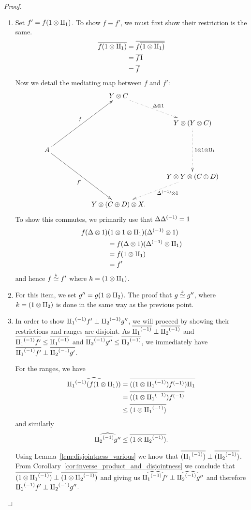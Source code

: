\begin{proof}
  \prepprooflist
  \begin{enumerate}[{(}i{)}]
  \item Set $f' = f(1\otimes\amalg_{1})$.
    To show $f\equiv f'$, we must first show their restriction is the same.
    \begin{align*}
      \overline{f(1\otimes\amalg_{1})} &= \overline{f\overline{(1\otimes\amalg_{1})}}\\
      & = \overline{f 1}\\
      &=  \overline{f}
    \end{align*}
    Now we detail the mediating map between $f$ and $f'$:
    \[
    \xymatrix @C=25pt @R=25pt{
      & & Y \* C \ar@{.>}[dr]^{\Delta\* 1}\\
      & & & Y \* (Y\* C) \ar@{.>}[dd]^{1\*1\*\cpa}\\
      A \ar[uurr]^f \ar[ddrr]_{f'} \\
      & & & Y \* Y\*(C\+ D) \ar@{.>}[dl]^(.4){\inv{\Delta}\* 1}\\
      && Y\*(C\+ D)\*X.
    }
    \]
  To show this commutes, we primarily use that $\Delta{\Delta}^{(-1)} = 1$
  \begin{align*}
    f(\Delta\otimes1)&(1\otimes1\otimes\amalg_{1})({\Delta}^{(-1)}\otimes1) \\
    &= f(\Delta\otimes1)({\Delta}^{(-1)} \otimes \amalg_{1})\\
    &= f(1 \otimes \amalg_{1})\\
    &= f'
  \end{align*}
  and hence $f\overset{\scriptscriptstyle h}{\simeq}f'$ where $h = (1\otimes\amalg_{1})$.
  \item For this item, we set $g'' = g(1\otimes\amalg_{2})$. The proof that $g\overset{\scriptscriptstyle k}{\simeq}g''$, where
    $k = (1\otimes\amalg_{2})$ is done in the same way as the previous point.
  \item In order to show  ${\amalg_{1}}^{(-1)} f' \perp {\amalg_{2}}^{(-1)} g''$, we will proceed by showing their restrictions
    and ranges are disjoint.
    As $\overline{{\amalg_{1}}^{(-1)}} \perp \overline{{\amalg_{2}}^{(-1)}}$ and $\overline{{\amalg_{1}}^{(-1)}f'} \le \overline{{\amalg_{1}}^{(-1)}}$ and
    $\overline{{\amalg_{2}}^{(-1)}g''} \le \overline{{\amalg_{2}}^{(-1)}}$, we immediately have
    $\overline{{\amalg_{1}}^{(-1)}f'} \perp \overline{{\amalg_{2}}^{(-1)}g'}$.

    For the ranges, we have
    \begin{align*}
      \widehat{{\amalg_{1}}^{(-1)} (f (1\otimes\amalg_{1}))} &=
      \overline{((1\otimes{\amalg_{1}}^{(-1)}){f}^{(-1)})\amalg_{1}}\\
      &= \overline{((1\otimes{\amalg_{1}}^{(-1)}){f}^{(-1)}}\\
      &\le \overline{(1\otimes{\amalg_{1}}^{(-1)})}
    \end{align*}
    and similarly
    \[
      \widehat{{\amalg_{2}}^{(-1)} g''} \le \overline{(1\otimes{\amalg_{2}}^{(-1)})}.
    \]

    Using Lemma~\ref{lem:disjointness_various}
    we know that $\overline{({\amalg_{1}}^{(-1)})}\perp \overline{({\amalg_{2}}^{(-1)})}$. From
    Corollary~\ref{cor:inverse_product_and_disjointness}
    we conclude that $\overline{(1\otimes{\amalg_{1}}^{(-1)})}\perp \overline{(1\otimes{\amalg_{2}}^{(-1)})}$ and giving us
    $\widehat{{\amalg_{1}}^{(-1)}f'} \perp \widehat{{\amalg_{2}}^{(-1)}g''}$ and therefore ${\amalg_{1}}^{(-1)}f' \perp {\amalg_{2}}^{(-1)}g''$.
  \end{enumerate}
\end{proof}
